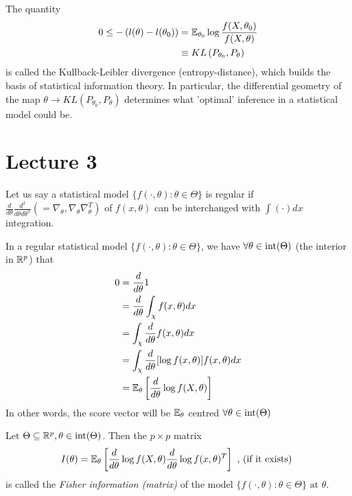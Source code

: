 \documentclass[a4paper]{article}
\begin{document}
The quantity 
\begin{align*}
	0 \le  -\left( l(\theta) - l(\theta_{0}) \right) &= \mathbb{E}_{\theta_{0}} \log \frac{f(X, \theta_{0})}{f(X, \theta)} \\
	&\equiv KL\left( P_{\theta_{0}}, P_{\theta} \right) 
\end{align*}
is called the Kullback-Leibler divergence (entropy-distance), which builds the basis of statistical information theory. In particular, the differential geometry of the map $\theta \to KL\left( P_{\theta_{0}}, P_{\theta} \right)$ determines what 'optimal' inference in a statistical model could be.

\section*{Lecture 3}

Let us say a statistical model $\{f(\cdot , \theta) : \theta \in \Theta\} $ is regular if $\frac{d}{d \theta} \frac{d^2}{d \theta d \theta ^{T}} ( = \nabla_{\theta}, \nabla_{\theta} \nabla_{\theta}^{T} )$ of $f(x, \theta)$ can be interchanged with $\int (\cdot ) dx$ integration.

\begin{observation}[2]
	In a regular statistical model $\{f(\cdot , \theta) : \theta \in \Theta\}$, we have $\forall \theta \in\operatorname{int}(\Theta)$ (the interior in $\mathbb{R}^{p}$) that
	\begin{align*}
		0 &= \frac{d}{d \theta} 1 \\
		&= \frac{d}{d \theta} \int_{\chi} f(x, \theta) dx \\
		&= \int_{\chi} \frac{d}{d\theta} f(x,\theta) dx \\
		&= \int_{\chi} \frac{d}{d \theta} [\log f(x, \theta)] f(x, \theta) dx \\
		&= \mathbb{E}_{\theta} \left[ \frac{d}{d \theta} \log f(X, \theta) \right]
	\end{align*}
	In other words, the score vector will be $\mathbb{E}_{\theta}$ centred $\forall \theta \in\operatorname{int}(\Theta)$
\end{observation}

\begin{defn}
	Let $\Theta \subseteq \mathbb{R}^{p}, \theta \in \operatorname{int}(\Theta)$. Then the $p\times p$ matrix
	\[
		I(\theta) = \mathbb{E}_{\theta}\left[ \frac{d}{d \theta} \log f(X, \theta) \frac{d}{d \theta} \log f(x, \theta)^{T} \right] 
		\text{ , (if it exists) }
	\]
	is called the \textit{Fisher information (matrix)} of the model $\{f(\cdot , \theta) : \theta \in \Theta\} \text{ at } \theta$.
\end{defn}
\end{document}
